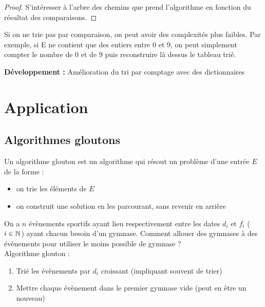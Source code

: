 \begin{proof}
	S'intéresser à l'arbre des chemins que prend l'algorithme en fonction du résultat des comparaisons.
\end{proof}

\begin{rem}
	Si on ne trie pas par comparaison, on peut avoir des complexités plus faibles. Par exemple, si E ne contient que des entiers entre 0 et 9, on peut simplement compter le nombre de 0 et de 9 puis reconstruire là dessus le tableau trié.
\end{rem}

\textbf{Développement :} Amélioration du tri par comptage avec des dictionnaires

\section{Application}

\subsection{Algorithmes gloutons}

\begin{definition}
	Un algorithme glouton est un algorithme qui résout un problème d'une entrée $E$ de la forme : \begin{itemize}
		\item on trie les éléments de $E$
		\item on construit une solution en les parcourant, sans revenir en arrière
	\end{itemize}
\end{definition}

\begin{example}
	\label{08-gymnase}
	On a $n$ évènements sportifs ayant lieu respectivement entre les dates $d_i$ et $f_i$ ($i \in \mathbb{N}$) ayant chacun besoin d'un gymnase. Comment allouer des gymnases à des évènements pour utiliser le moins possible de gymnase ? \\
	
	Algorithme glouton :\begin{enumerate}
		\item Trié les évènements par $d_i$ croissant (impliquant souvent de trier)
		\item Mettre chaque évènement dans le premier gymnase vide (peut en être un nouveau)
	\end{enumerate}
\end{example}

